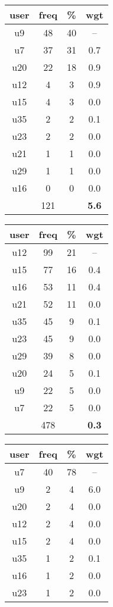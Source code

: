 \begin{appendices}
\begin{table}
\begin{tabular}{ |c|c|c|c| }
	\hline
	\textbf{user} & \textbf{freq} & \textbf{\%} & \textbf{wgt} \\
	\hline
	u9 & 48 & 40 & -- \\
	u7 & 37 & 31 & 0.7 \\
	u20 & 22 & 18 & 0.9 \\
	u12 & 4 & 3 & 0.9 \\
	u15 & 4 & 3 & 0.0 \\
	u35 & 2 & 2 & 0.1 \\
	u23 & 2 & 2 & 0.0 \\
	u21 & 1 & 1 & 0.0 \\
	u29 & 1 & 1 & 0.0 \\
	u16 & 0 & 0 & 0.0 \\
	 & 121 & & \textbf{5.6} \\
	\hline
\end{tabular}
\begin{tabular}{ |c|c|c|c| }
	\hline
	\textbf{user} & \textbf{freq} & \textbf{\%} & \textbf{wgt} \\
	\hline
	u12 & 99 & 21 & -- \\
	u15 & 77 & 16 & 0.4 \\
	u16 & 53 & 11 & 0.4 \\
	u21 & 52 & 11 & 0.0 \\
	u35 & 45 & 9 & 0.1 \\
	u23 & 45 & 9 & 0.0 \\
	u29 & 39 & 8 & 0.0 \\
	u20 & 24 & 5 & 0.1 \\
	u9 & 22 & 5 & 0.0 \\
	u7 & 22 & 5 & 0.0 \\
	 & 478 & & \textbf{0.3} \\
	\hline
\end{tabular}
\begin{tabular}{ |c|c|c|c| }
	\hline
	\textbf{user} & \textbf{freq} & \textbf{\%} & \textbf{wgt} \\
	\hline
	u7 & 40 & 78 & -- \\
	u9 & 2 & 4 & 6.0 \\
	u20 & 2 & 4 & 0.0 \\
	u12 & 2 & 4 & 0.0 \\
	u15 & 2 & 4 & 0.0 \\
	u35 & 1 & 2 & 0.1 \\
	u16 & 1 & 2 & 0.0 \\
	u23 & 1 & 2 & 0.0 \\

\end{tabular}
\end{table}
\end{appendices}
